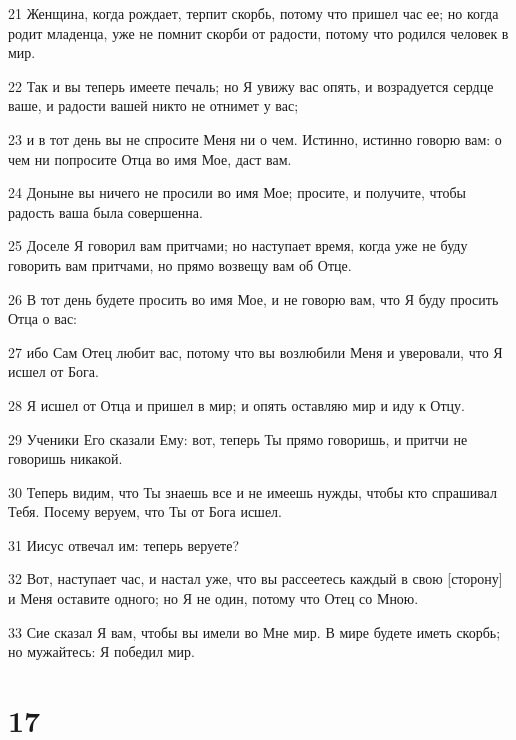\par 21 Женщина, когда рождает, терпит скорбь, потому что пришел час ее; но когда родит младенца, уже не помнит скорби от радости, потому что родился человек в мир.
\par 22 Так и вы теперь имеете печаль; но Я увижу вас опять, и возрадуется сердце ваше, и радости вашей никто не отнимет у вас;
\par 23 и в тот день вы не спросите Меня ни о чем. Истинно, истинно говорю вам: о чем ни попросите Отца во имя Мое, даст вам.
\par 24 Доныне вы ничего не просили во имя Мое; просите, и получите, чтобы радость ваша была совершенна.
\par 25 Доселе Я говорил вам притчами; но наступает время, когда уже не буду говорить вам притчами, но прямо возвещу вам об Отце.
\par 26 В тот день будете просить во имя Мое, и не говорю вам, что Я буду просить Отца о вас:
\par 27 ибо Сам Отец любит вас, потому что вы возлюбили Меня и уверовали, что Я исшел от Бога.
\par 28 Я исшел от Отца и пришел в мир; и опять оставляю мир и иду к Отцу.
\par 29 Ученики Его сказали Ему: вот, теперь Ты прямо говоришь, и притчи не говоришь никакой.
\par 30 Теперь видим, что Ты знаешь все и не имеешь нужды, чтобы кто спрашивал Тебя. Посему веруем, что Ты от Бога исшел.
\par 31 Иисус отвечал им: теперь веруете?
\par 32 Вот, наступает час, и настал уже, что вы рассеетесь каждый в свою [сторону] и Меня оставите одного; но Я не один, потому что Отец со Мною.
\par 33 Сие сказал Я вам, чтобы вы имели во Мне мир. В мире будете иметь скорбь; но мужайтесь: Я победил мир.

\chapter{17}

